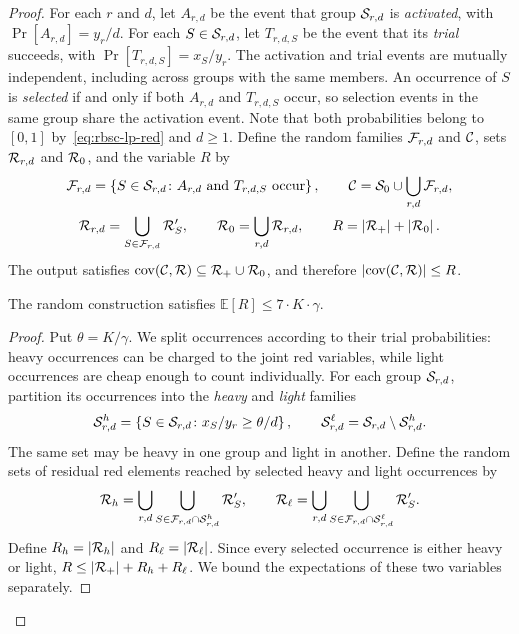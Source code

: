 \begin{proof}
For each $r$ and $d$, let $A_{r,d}$ be the event that group $\mathcal{S}_{r,d}$ is \emph{activated}, with $\Pr[A_{r,d}]=y_r/d$. For each $S\in\mathcal{S}_{r,d}$, let $T_{r,d,S}$ be the event that its \emph{trial} succeeds, with $\Pr[T_{r,d,S}]=x_S/y_r$. The activation and trial events are mutually independent, including across groups with the same members. An occurrence of $S$ is \emph{selected} if and only if both $A_{r,d}$ and $T_{r,d,S}$ occur, so selection events in the same group share the activation event. Note that both probabilities belong to $[0,1]$ by~\eqref{eq:rbsc-lp-red} and $d\geq1$. Define the random families $\mathcal{F}_{r,d}$ and $\mathcal{C}$, sets $\mathcal{R}_{r,d}$ and $\mathcal{R}_0$, and the variable $R$ by
\[
 \begin{gathered}
 \mathcal{F}_{r,d}=\mathopen{}\left\{ S\in\mathcal{S}_{r,d}\colon A_{r,d}\text{ and }T_{r,d,S}\text{ occur} \right\},
 \qquad \mathcal{C}=\mathcal{S}_0\cup\bigcup_{r,d}\mathcal{F}_{r,d},\\
 \mathcal{R}_{r,d}=\bigcup_{S\in\mathcal{F}_{r,d}}\mathcal{R}'_S,
 \qquad \mathcal{R}_0=\bigcup_{r,d}\mathcal{R}_{r,d},
 \qquad R=\mathopen{}\left| \mathcal{R}_+ \right|+\mathopen{}\left| \mathcal{R}_0 \right|.
 \end{gathered}
\]
The output satisfies $\operatorname{cov}\mathopen{}\left( \mathcal{C},\mathcal{R} \right)\subseteq\mathcal{R}_+\cup\mathcal{R}_0$, and therefore $\mathopen{}\left| \operatorname{cov}\mathopen{}\left( \mathcal{C},\mathcal{R} \right) \right|\leq R$.

\begin{claim}\label{claim:rbsc-red-cost}
The random construction satisfies $\mathbb{E}[R]\leq7\cdot K\cdot \gamma$.
\end{claim}
\begin{proof}
Put $\theta=K/\gamma$. We split occurrences according to their trial probabilities: heavy occurrences can be charged to the joint red variables, while light occurrences are cheap enough to count individually. For each group $\mathcal{S}_{r,d}$, partition its occurrences into the \emph{heavy} and \emph{light} families
\[
 \mathcal{S}^h_{r,d}=\mathopen{}\left\{ S\in\mathcal{S}_{r,d}\colon x_S/y_r\geq\theta/d \right\},
 \qquad \mathcal{S}^\ell_{r,d}=\mathcal{S}_{r,d}\setminus\mathcal{S}^h_{r,d}.
\]
The same set may be heavy in one group and light in another. Define the random sets of residual red elements reached by selected heavy and light occurrences by
\[
 \mathcal{R}_h=\bigcup_{r,d}\bigcup_{S\in\mathcal{F}_{r,d}\cap\mathcal{S}^h_{r,d}}\mathcal{R}'_S,
 \qquad
 \mathcal{R}_\ell=\bigcup_{r,d}\bigcup_{S\in\mathcal{F}_{r,d}\cap\mathcal{S}^\ell_{r,d}}\mathcal{R}'_S.
\]
Define $R_h=\mathopen{}\left| \mathcal{R}_h \right|$ and $R_\ell=\mathopen{}\left| \mathcal{R}_\ell \right|$. Since every selected occurrence is either heavy or light, $R\leq\mathopen{}\left| \mathcal{R}_+ \right|+R_h+R_\ell$. We bound the expectations of these two variables separately.


\end{proof}
\end{proof}
